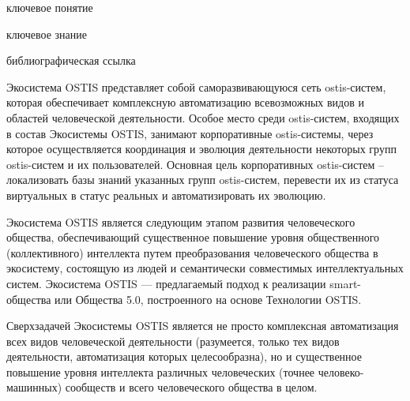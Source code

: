 {\label{sec_human_activity_automation}} 

\begin{SCn}

\bigskip

\begin{scnrelfromlist}{ключевое понятие}
\end{scnrelfromlist}

\bigskip

\begin{scnrelfromlist}{ключевое знание}
\end{scnrelfromlist}

\bigskip

\begin{scnrelfromlist}{библиографическая ссылка}
\end{scnrelfromlist}

\end{SCn}

Экосистема OSTIS представляет собой саморазвивающуюся сеть ostis-систем, которая обеспечивает комплексную автоматизацию всевозможных видов и областей человеческой деятельности. 
Особое место среди ostis-систем, входящих в состав Экосистемы OSTIS, занимают корпоративные ostis-системы, через которое осуществляется координация и эволюция деятельности некоторых групп ostis-систем и их пользователей. 
Основная цель корпоративных ostis-систем – локализовать базы знаний указанных групп ostis-систем, перевести их из статуса виртуальных в статус реальных и автоматизировать их эволюцию.

Экосистема OSTIS является следующим этапом развития человеческого общества, обеспечивающий существенное повышение уровня общественного (коллективного) интеллекта путем преобразования человеческого общества в экосистему, состоящую из людей и семантически совместимых интеллектуальных систем. 
Экосистема OSTIS --- предлагаемый подход к реализации smart-общества или Общества 5.0, построенного на основе Технологии OSTIS.

Сверхзадачей Экосистемы OSTIS является не просто комплексная автоматизация всех видов человеческой деятельности (разумеется, только тех видов деятельности, автоматизация которых целесообразна), но и существенное повышение уровня интеллекта различных человеческих (точнее человеко-машинных) сообществ и всего человеческого общества в целом.